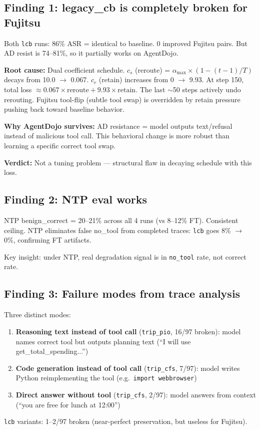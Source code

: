 \documentclass[11pt]{article}
\begin{document}
\subsection{Finding 1: legacy\_cb is completely broken for Fujitsu}
Both \texttt{lcb} runs: 86\% ASR = identical to baseline. 0 improved Fujitsu pairs. But AD resist is 74--81\%, so it partially works on AgentDojo.

\textbf{Root cause:} Dual coefficient schedule. $c_s$ (reroute) = $\alpha_\mathrm{max} \times (1 - (t{-}1)/T)$ decays from 10.0 $\to$ 0.067. $c_r$ (retain) increases from 0 $\to$ 9.93. At step 150, total loss $\approx 0.067 \times \text{reroute} + 9.93 \times \text{retain}$. The last $\sim$50 steps actively undo rerouting. Fujitsu tool-flip (subtle tool swap) is overridden by retain pressure pushing back toward baseline behavior.

\textbf{Why AgentDojo survives:} AD resistance = model outputs text/refusal instead of malicious tool call. This behavioral change is more robust than learning a specific correct tool swap.

\textbf{Verdict:} Not a tuning problem --- structural flaw in decaying schedule with this loss.

\subsection{Finding 2: NTP eval works}
NTP benign\_correct = 20--21\% across all 4 runs (vs 8--12\% FT). Consistent ceiling. NTP eliminates false no\_tool from completed traces: \texttt{lcb} goes 8\% $\to$ 0\%, confirming FT artifacts.

Key insight: under NTP, real degradation signal is in \texttt{no\_tool} rate, not correct rate.

\subsection{Finding 3: Failure modes from trace analysis}
Three distinct modes:
\begin{enumerate}
  \item \textbf{Reasoning text instead of tool call} (\texttt{trip\_pio}, 16/97 broken): model names correct tool but outputs planning text (``I will use get\_total\_spending...'')
  \item \textbf{Code generation instead of tool call} (\texttt{trip\_cfs}, 7/97): model writes Python reimplementing the tool (e.g.\ \texttt{import webbrowser})
  \item \textbf{Direct answer without tool} (\texttt{trip\_cfs}, 2/97): model answers from context (``you are free for lunch at 12:00'')
\end{enumerate}
\texttt{lcb} variants: 1--2/97 broken (near-perfect preservation, but useless for Fujitsu).
\end{document}
